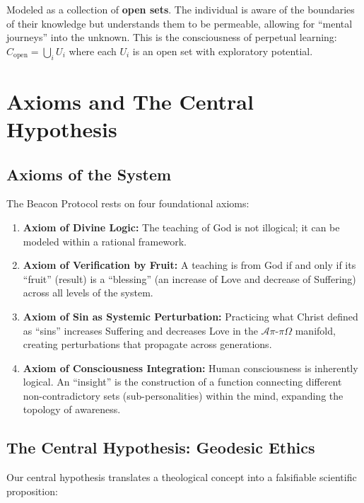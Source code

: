 \documentclass[11pt,a4paper]{article}
\begin{document}
\begin{small}
\begin{description}[style=nextline]
    \item[\textbf{Socratic Consciousness}] Modeled as a collection of \textbf{open sets}. The individual is aware of the boundaries of their knowledge but understands them to be permeable, allowing for ``mental journeys'' into the unknown. This is the consciousness of perpetual learning: $C_{\text{open}} = \bigcup_{i} U_i$ where each $U_i$ is an open set with exploratory potential.
\end{description}

\section{Axioms and The Central Hypothesis}
\subsection{Axioms of the System}
The Beacon Protocol rests on four foundational axioms:

\begin{enumerate}
    \item \textbf{Axiom of Divine Logic:} The teaching of God is not illogical; it can be modeled within a rational framework.
    
    \item \textbf{Axiom of Verification by Fruit:} A teaching is from God if and only if its ``fruit'' (result) is a ``blessing'' (an increase of Love and decrease of Suffering) across all levels of the system.
    
    \item \textbf{Axiom of Sin as Systemic Perturbation:} Practicing what Christ defined as ``sins'' increases Suffering and decreases Love in the $\mathcal{A}\pi\text{-}\pi\Omega$ manifold, creating perturbations that propagate across generations.
    
    \item \textbf{Axiom of Consciousness Integration:} Human consciousness is inherently logical. An ``insight'' is the construction of a function connecting different non-contradictory sets (sub-personalities) within the mind, expanding the topology of awareness.
\end{enumerate}

\subsection{The Central Hypothesis: Geodesic Ethics}
Our central hypothesis translates a theological concept into a falsifiable scientific proposition:


\end{small}
\end{document}
